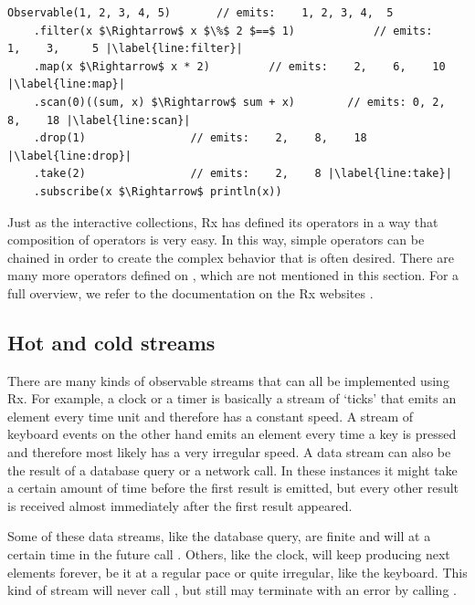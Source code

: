 \begin{minipage}{\linewidth}
\begin{lstlisting}[style=ScalaStyle, caption={Operators on \obs}, label={lst:operators-obs}, columns=fixed]
Observable(1, 2, 3, 4, 5)		// emits:    1, 2, 3, 4,  5
    .filter(x $\Rightarrow$ x $\%$ 2 $==$ 1)			// emits:    1,    3,     5 |\label{line:filter}|
    .map(x $\Rightarrow$ x * 2)			// emits:    2,    6,    10 |\label{line:map}|
    .scan(0)((sum, x) $\Rightarrow$ sum + x)		// emits: 0, 2,    8,    18 |\label{line:scan}|
    .drop(1)				// emits:    2,    8,    18 |\label{line:drop}|
    .take(2)				// emits:    2,    8 |\label{line:take}|
    .subscribe(x $\Rightarrow$ println(x))
\end{lstlisting}
\end{minipage}

Just as the interactive collections, Rx has defined its operators in a way that composition of operators is very easy. In this way, simple operators can be chained in order to create the complex behavior that is often desired. There are many more operators defined on \obs, which are not mentioned in this section. For a full overview, we refer to the documentation on the Rx websites \cite{ReactiveX, rx-api, Rx.Net}.

\subsection{Hot and cold streams}
\label{subsec:stream-kinds}
There are many kinds of observable streams that can all be implemented using Rx. For example, a clock or a timer is basically a stream of `ticks' that emits an element every time unit and therefore has a constant speed. A stream of keyboard events on the other hand emits an element every time a key is pressed and therefore most likely has a very irregular speed. A data stream can also be the result of a database query or a network call. In these instances it might take a certain amount of time before the first result is emitted, but every other result is received almost immediately after the first result appeared.

Some of these data streams, like the database query, are finite and will at a certain time in the future call . Others, like the clock, will keep producing next elements forever, be it at a regular pace or quite irregular, like the keyboard. This kind of stream will never call , but still may terminate with an error by calling .

